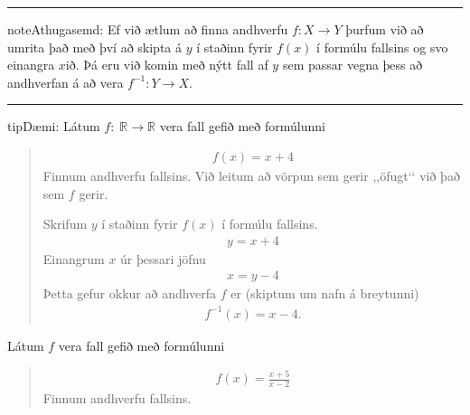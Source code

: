 \documentclass[a4paper,10pt,icelandic]{sphinxmanual}
\begin{document}
\bigskip\hrule\bigskip


\begin{sphinxadmonition}{note}{Athugasemd:}
Ef við ætlum að finna andhverfu \(f : X \to Y\) þurfum við að umrita það með því að skipta á \(y\) í staðinn fyrir \(f(x)\) í formúlu fallsins og svo einangra \(x\)\sphinxhyphen{}ið.
Þá eru við komin með nýtt fall af \(y\) sem passar vegna þess að andhverfan á að vera \(f^{-1} : Y \to X\).
\end{sphinxadmonition}


\bigskip\hrule\bigskip


\begin{sphinxadmonition}{tip}{Dæmi:}
 Látum \(f:\;\mathbb{R}\to\mathbb{R}\) vera fall gefið með formúlunni
\begin{quote}
\begin{equation*}
\begin{split}f(x)=x+4\end{split}
\end{equation*}
Finnum andhverfu fallsins. Við leitum að vörpun sem gerir ,,öfugt‘‘ við það sem \(f\) gerir.

Skrifum \(y\) í staðinn fyrir \(f(x)\) í formúlu fallsins.
\begin{equation*}
\begin{split}y=x+4\end{split}
\end{equation*}
Einangrum \(x\) úr þessari jöfnu
\begin{equation*}
\begin{split}x=y-4\end{split}
\end{equation*}
Þetta gefur okkur að andhverfa \(f\) er (skiptum um nafn á breytunni)
\begin{equation*}
\begin{split}f^{-1}(x)=x-4.\end{split}
\end{equation*}\end{quote}

 Látum \(f\) vera fall gefið með formúlunni
\begin{quote}
\begin{equation*}
\begin{split}f(x)=\frac{x+5}{x-2}\end{split}
\end{equation*}
Finnum andhverfu fallsins.


\end{quote}
\end{sphinxadmonition}
\end{document}
